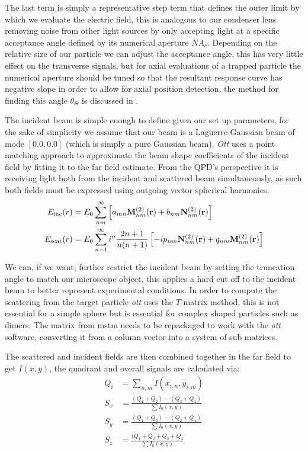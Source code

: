 The last term is simply a representative step term that defines 
the outer limit by which we evaluate the electric field, this is 
analogous to our condenser lens removing noise from other light 
sources by only accepting light at a specific acceptance angle 
defined by its numerical aperture $NA_c$. Depending on the 
relative size of our particle we can adjust the acceptance angle, 
this has very little effect on the transverse signals, but for 
axial evaluations of a trapped particle the numerical aperture 
should be tuned so that the resultant response curve has negative 
slope in order to allow for axial position detection, the method 
for finding this angle $\theta_\Theta$ is discussed in \cite{Friedrich2012}.

The incident beam is simple enough to define given our set up 
parameters, for the sake of simplicity we assume that our beam is a Laguerre-Gaussian 
beam of mode $[0.0, 0.0]$ (which is simply a pure Gaussian beam). 
\textit{Ott} uses a point matching approach to approximate the beam shape 
coefficients of the incident field by fitting it to the far field estimate. 
From the QPD's perspective it is receiving light both from the incident 
and scattered beam simultaneously, as such both fields must be expressed
using outgoing vector spherical harmonics.
\begin{align}
	E_{\rm inc}(r)&=
	E_0\sum^\infty_{nm}\left[a_{mn}{\bf M}^{(2)}_{nm}({\bf r})+
	b_{nm}{\bf N}^{(2)}_{nm}({\bf r}) \right] 
	\\
	E_{\rm scat}(r)&=E_0 \sum_{n=1}^\infty i^n\frac{2n+1}{n(n+1)}\left[
	-i p_{nm}{\bf N}_{nm}^{(2)}({\bf r})+q_{nm}{\bf M}_{nm}^{(2)}({\bf r})
	\right] 
\end{align}

We can, if we want, further restrict the incident beam by setting 
the truncation angle to match our microscope object, this applies a 
hard cut off to the incident beam to better represent experimental 
conditions. In order to compute the scattering from 
the target particle \textit{ott} uses the $T$-matrix method, this is 
not essential for a simple sphere but is essential for complex shaped 
particles such as dimers. The matrix from mstm needs to be repackaged 
to work with the \textit{ott} software, converting it from a column 
vector into a system of sub matrices. 

The scattered and incident fields are then combined together 
in the far field to get $I(x,y)$, the quadrant and overall signals are 
calculated via:
\begin{align}
	Q_i &= \sum_{n,m} I(x_{i,n}, y_{i,m}) \\
	S_{x} &= \frac{(Q_1+Q_2)-(Q_3+Q_4)}{\sum I_0(x,y)} \\
	S_{y} &= \frac{(Q_1+Q_3)-(Q_2+Q_4)}{\sum I_0(x,y)} \\
	S_{z} &= \frac{(Q_1+Q_2+Q_3+Q_4}{\sum I_0(x,y)}
\end{align}

